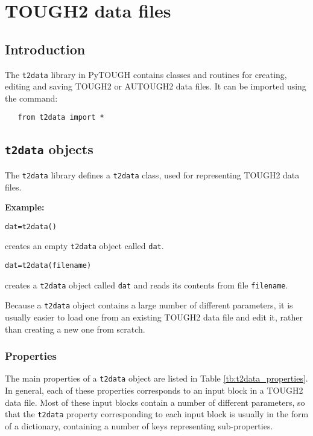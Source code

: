 \chapter{TOUGH2 data files}
\label{datafiles}

\section{Introduction}
The \texttt{t2data} library in PyTOUGH contains classes and routines for creating, editing and saving TOUGH2 or AUTOUGH2 data files.  It can be imported using the command:

\begin{verbatim}
   from t2data import *
\end{verbatim}

\section{\texttt{t2data} objects}

The \texttt{t2data} library defines a \texttt{t2data} class, used for representing TOUGH2 data files.

\textbf{Example:}

\begin{verbatim}
dat=t2data()
\end{verbatim}

creates an empty \texttt{t2data} object called \texttt{dat}.

\begin{verbatim}
dat=t2data(filename)
\end{verbatim}

creates a \texttt{t2data} object called \texttt{dat} and reads its contents from file \texttt{filename}.

Because a \texttt{t2data} object contains a large number of different parameters, it is usually easier to load one from an existing TOUGH2 data file and edit it, rather than creating a new one from scratch. 

\subsection{Properties}

The main properties of a \texttt{t2data} object are listed in Table \ref{tb:t2data_properties}.  In general, each of these properties corresponds to an input block in a TOUGH2 data file.  Most of these input blocks contain a number of different parameters, so that the \texttt{t2data} property corresponding to each input block is usually in the form of a dictionary, containing a number of keys representing sub-properties.

